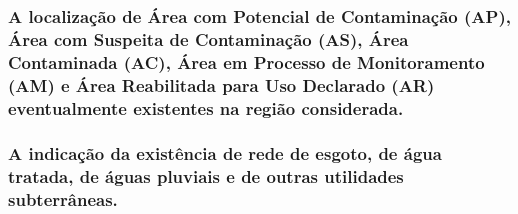 \subsubsection{A localização de Área com Potencial de Contaminação (AP), 
Área com Suspeita de Contaminação (AS), Área Contaminada 
(AC), Área em Processo de Monitoramento (AM) e Área 
Reabilitada para Uso Declarado (AR) eventualmente 
existentes na região considerada.}

\subsubsection{A indicação da existência de rede de esgoto, de água 
tratada, de águas pluviais e de outras utilidades 
subterrâneas.}

